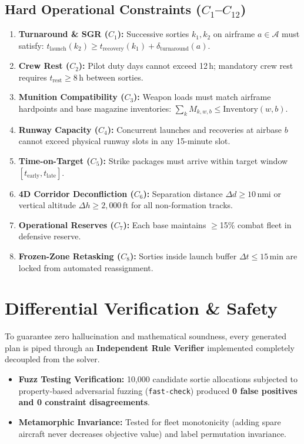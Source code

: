 \documentclass[10pt,twocolumn,a4paper]{article}
\begin{document}
\subsection{Hard Operational Constraints ($C_1$--$C_{12}$)}
\begin{enumerate}
    \item \textbf{Turnaround \& SGR ($C_1$):} Successive sorties $k_1, k_2$ on airframe $a \in \mathcal{A}$ must satisfy:
    $t_{\text{launch}}(k_2) \ge t_{\text{recovery}}(k_1) + \delta_{\text{turnaround}}(a)$.
    \item \textbf{Crew Rest ($C_2$):} Pilot duty days cannot exceed 12\,h; mandatory crew rest requires $t_{\text{rest}} \ge 8$\,h between sorties.
    \item \textbf{Munition Compatibility ($C_3$):} Weapon loads must match airframe hardpoints and base magazine inventories: $\sum_{k} M_{k, w, b} \le \text{Inventory}(w, b)$.
    \item \textbf{Runway Capacity ($C_4$):} Concurrent launches and recoveries at airbase $b$ cannot exceed physical runway slots in any 15-minute slot.
    \item \textbf{Time-on-Target ($C_5$):} Strike packages must arrive within target window $[t_{\text{early}}, t_{\text{late}}]$.
    \item \textbf{4D Corridor Deconfliction ($C_6$):} Separation distance $\Delta d \ge 10\,\text{nmi}$ or vertical altitude $\Delta h \ge 2,000\,\text{ft}$ for all non-formation tracks.
    \item \textbf{Operational Reserves ($C_7$):} Each base maintains $\ge$15\% combat fleet in defensive reserve.
    \item \textbf{Frozen-Zone Retasking ($C_8$):} Sorties inside launch buffer $\Delta t \le 15\,\text{min}$ are locked from automated reassignment.
\end{enumerate}

\vspace{-0.5em}
\section{Differential Verification \& Safety}
\footnotesize
To guarantee zero hallucination and mathematical soundness, every generated plan is piped through an \textbf{Independent Rule Verifier} implemented completely decoupled from the solver.
\begin{itemize}
    \item \textbf{Fuzz Testing Verification:} 10,000 candidate sortie allocations subjected to property-based adversarial fuzzing (\texttt{fast-check}) produced \textbf{0 false positives and 0 constraint disagreements}.
    \item \textbf{Metamorphic Invariance:} Tested for fleet monotonicity (adding spare aircraft never decreases objective value) and label permutation invariance.
\end{itemize}
\end{document}
